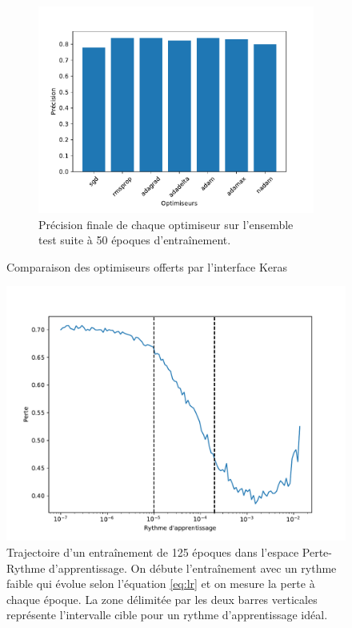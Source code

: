 \documentclass{article}
\begin{document}
\begin{figure}[H]
	\begin{subfigure}{.48\textwidth}
		\centering
		\includegraphics[scale=0.42]{imgs/compare_test_acc.pdf}
		\caption{Précision finale de chaque optimiseur sur l'ensemble test suite à 50 époques d'entraînement.}
	\end{subfigure}
	\caption{Comparaison des optimiseurs offerts par l'interface Keras}
	\label{fig:comp_opti}
\end{figure}

\begin{figure}[H]
	\includegraphics[scale=0.8]{imgs/acc_lr.pdf}
	\caption{Trajectoire d'un entraînement de 125 époques dans l'espace Perte-Rythme d'apprentissage. On débute l'entraînement avec un rythme faible qui évolue selon l'équation \ref{eq:lr} et on mesure la perte à chaque époque. La zone délimitée par les deux barres verticales représente l'intervalle cible pour un rythme d'apprentissage idéal.}
	\label{fig:acc_lr}
\end{figure}
\end{document}
